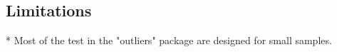 


\subsection{Limitations}

*  Most of the test in the "outliers" package are designed for small samples. 



